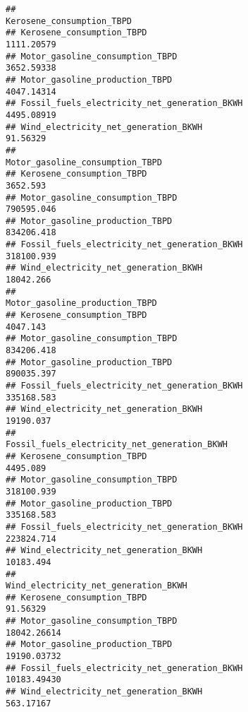 \documentclass[
]{article}
\begin{document}
\begin{verbatim}
##                                              Kerosene_consumption_TBPD
## Kerosene_consumption_TBPD                                   1111.20579
## Motor_gasoline_consumption_TBPD                             3652.59338
## Motor_gasoline_production_TBPD                              4047.14314
## Fossil_fuels_electricity_net_generation_BKWH                4495.08919
## Wind_electricity_net_generation_BKWH                          91.56329
##                                              Motor_gasoline_consumption_TBPD
## Kerosene_consumption_TBPD                                           3652.593
## Motor_gasoline_consumption_TBPD                                   790595.046
## Motor_gasoline_production_TBPD                                    834206.418
## Fossil_fuels_electricity_net_generation_BKWH                      318100.939
## Wind_electricity_net_generation_BKWH                               18042.266
##                                              Motor_gasoline_production_TBPD
## Kerosene_consumption_TBPD                                          4047.143
## Motor_gasoline_consumption_TBPD                                  834206.418
## Motor_gasoline_production_TBPD                                   890035.397
## Fossil_fuels_electricity_net_generation_BKWH                     335168.583
## Wind_electricity_net_generation_BKWH                              19190.037
##                                              Fossil_fuels_electricity_net_generation_BKWH
## Kerosene_consumption_TBPD                                                        4495.089
## Motor_gasoline_consumption_TBPD                                                318100.939
## Motor_gasoline_production_TBPD                                                 335168.583
## Fossil_fuels_electricity_net_generation_BKWH                                   223824.714
## Wind_electricity_net_generation_BKWH                                            10183.494
##                                              Wind_electricity_net_generation_BKWH
## Kerosene_consumption_TBPD                                                91.56329
## Motor_gasoline_consumption_TBPD                                       18042.26614
## Motor_gasoline_production_TBPD                                        19190.03732
## Fossil_fuels_electricity_net_generation_BKWH                          10183.49430
## Wind_electricity_net_generation_BKWH                                    563.17167
\end{verbatim}
\end{document}
